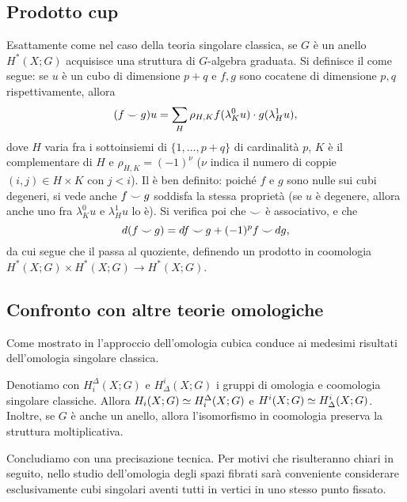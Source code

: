 \subsection{Prodotto cup}\label{cubic-homology:cup-product}
Esattamente come nel caso della teoria singolare classica, se $G$ è un anello $H^*(X;G)$ acquisisce una struttura di $G$-algebra graduata. Si definisce il \cupproduct{} come segue: se $u$ è un cubo di dimensione $p+q$ e $f,g$ sono cocatene di dimensione $p,q$ rispettivamente, allora
$$
(f\mathbin{\smile} g)u=\sum_H\rho_{H,K}f(\lambda^0_Ku)\cdot g(\lambda^1_Hu),
$$
dove $H$ varia fra i sottoinsiemi di $\{1,\ldots,p+q\}$ di cardinalità $p$, $K$ è il complementare di $H$ e $\rho_{H,K}=(-1)^\nu$ ($\nu$ indica il numero di coppie $(i,j)\in H\times K$ con $j<i$). Il \cupproduct{} è ben definito: poiché $f$ e $g$ sono nulle sui cubi degeneri, si vede anche $f\mathbin{\smile} g$ soddisfa la stessa proprietà (se $u$ è degenere, allora anche uno fra $\lambda^0_Ku$ e $\lambda^1_Hu$ lo è). Si verifica poi che $\mathbin{\smile}$ è associativo, e che
$$
d(f\mathbin{\smile} g)=df\mathbin{\smile} g+(-1)^pf\mathbin{\smile} dg,
$$
da cui segue che il \cupproduct{} passa al quoziente, definendo un prodotto in coomologia $H^*(X;G)\times H^*(X;G)\to H^*(X;G)$.

\subsection{Confronto con altre teorie omologiche}\label{cubic-homology:comparison}
Come mostrato in  l'approccio dell'omologia cubica conduce ai medesimi risultati dell'omologia singolare classica.

\begin{proposition}
Denotiamo con $H_i^\Delta(X;G)$ e $H^i_\Delta(X;G)$ i gruppi di omologia e coomologia singolare classiche. Allora $H_i(X;G)\simeq H_i^\Delta(X;G)$ e $H^i(X;G)\simeq H_\Delta^i(X;G)$. Inoltre, se $G$ è anche un anello, allora l'isomorfismo in coomologia preserva la struttura moltiplicativa.
\end{proposition}

Concludiamo con una precisazione tecnica. Per motivi che risulteranno chiari in seguito, nello studio dell'omologia degli spazi fibrati sarà conveniente considerare esclusivamente cubi singolari aventi tutti in vertici in uno stesso punto fissato.

